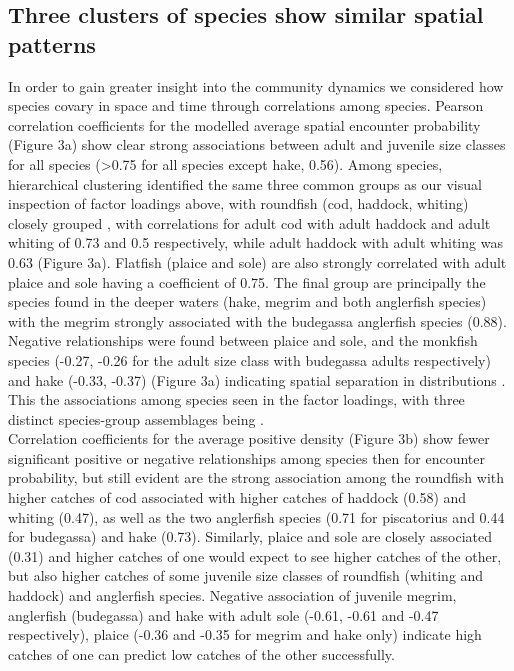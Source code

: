 \documentclass[fleqn,10pt]{wlscirep}
\begin{document}
\begin{linenumbers}
\subsection*{Three clusters of species show similar spatial patterns\\} In
order to gain greater insight into the community dynamics we considered how
species covary in space and time through correlations among species.  Pearson
correlation coefficients for the modelled average spatial encounter probability
(Figure 3a) show clear strong associations between adult and juvenile size
classes for all species (\textgreater 0.75 for all species except hake, 0.56).
Among species, hierarchical clustering identified the same three common
groups as our visual inspection of factor loadings
above, with roundfish (cod, haddock, whiting) closely grouped
, with correlations for adult cod with
adult haddock and adult whiting of 0.73 and 0.5 respectively, while adult
haddock with adult whiting was 0.63 (Figure 3a). Flatfish (plaice and sole) are
also strongly correlated with adult plaice and sole having a coefficient of
0.75.  The final group are principally the species found in the deeper waters
(hake, megrim and both anglerfish species) with the megrim strongly associated
with the budegassa anglerfish species (0.88). Negative relationships were found
between plaice and sole, and the monkfish species (-0.27, -0.26 for the adult
size class with budegassa adults respectively) and hake (-0.33, -0.37) (Figure
3a) indicating spatial separation in distributions . This
 the associations among species seen in
the factor loadings, with three distinct species-group assemblages being
.\\

Correlation coefficients for the average positive density (Figure 3b) show
fewer significant positive or negative relationships among species then for
encounter probability, but still evident are the strong association among the
roundfish with higher catches of cod  associated with
higher catches of haddock (0.58) and whiting (0.47), as well as the two
anglerfish species (0.71 for piscatorius and 0.44 for budegassa) and hake
(0.73). Similarly, plaice and sole are closely associated (0.31) and higher
catches of one would expect to see higher catches of the other, but also higher
catches of some juvenile size classes of roundfish (whiting and haddock) and
anglerfish species. Negative association of juvenile megrim, anglerfish
(budegassa) and hake with adult sole (-0.61, -0.61 and -0.47 respectively),
plaice (-0.36 and -0.35 for megrim and hake only) indicate high catches of one
can predict low catches of the other successfully.\\


\end{linenumbers}
\end{document}
